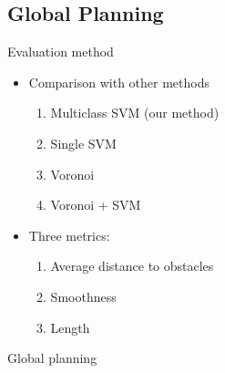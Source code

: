 \subsection{Global Planning}

\begin{frame}{Evaluation method}
  \begin{itemize}
    \item Comparison with other methods
    \begin{enumerate}
      \item Multiclass SVM (our method)
      \item Single SVM \citep{miura2006support}
      \item Voronoi
      \item Voronoi + SVM \citep{yang2012safe}
    \end{enumerate}
    \item Three metrics:
    \begin{enumerate}
      \item Average distance to obstacles
      \item Smoothness
      \item Length
    \end{enumerate}
  \end{itemize}
\end{frame}

% 
% 

\begin{frame}[plain]{Global planning}
  \begin{center}
  \end{center}
\end{frame}


